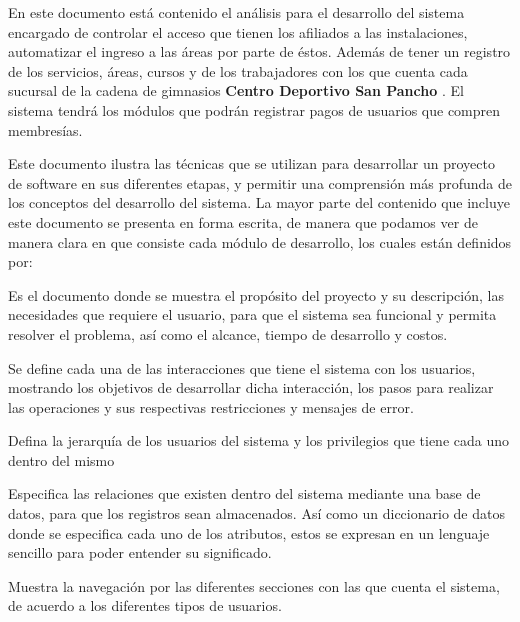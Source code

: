 \begin{description}
	\item
En este documento está contenido el análisis para el desarrollo del sistema encargado de controlar el acceso que tienen los afiliados a las instalaciones, automatizar el ingreso a las áreas por parte de éstos. Además de tener un registro de los servicios, áreas, cursos y de los trabajadores con los que cuenta cada sucursal de la cadena de gimnasios {\bf Centro Deportivo San Pancho }. El sistema tendrá los módulos que podrán registrar pagos de usuarios que compren membresías.
	
Este documento ilustra las técnicas que se utilizan para desarrollar un proyecto de software en sus diferentes etapas, y permitir una comprensión más profunda de los conceptos del desarrollo del sistema. La mayor parte del contenido que incluye este documento se presenta en forma escrita, de manera que podamos ver de manera clara en que consiste cada módulo de desarrollo, los cuales están definidos por:

	\item[Project Charter:] Es el documento donde se muestra el propósito del proyecto y su descripción, las necesidades que requiere el usuario, para que el sistema sea funcional y permita resolver el problema, así como el alcance, tiempo de desarrollo y costos.
	\item[Modelo del comportamiento:] Se define cada una de las interacciones que tiene el sistema con los usuarios, mostrando los objetivos de desarrollar dicha interacción, los pasos para realizar las operaciones y sus respectivas restricciones y mensajes de error.
	\item[Modelado de actores:] Defina la jerarquía de los usuarios del sistema y los privilegios que tiene cada uno dentro del mismo
	\item[Modelo del dominio del problema:] Especifica las relaciones que existen dentro del sistema mediante una base de datos, para que los registros sean almacenados. Así como un diccionario de datos donde se especifica cada uno de los atributos, estos se expresan en un lenguaje sencillo para poder entender su significado.
	\item[Modelo de interacción con el usuario:] Muestra la navegación por las diferentes secciones con las que cuenta el sistema, de acuerdo a los diferentes tipos de usuarios.
\end{description}

\newpage
